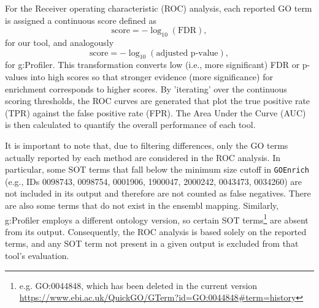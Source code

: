 \documentclass{article}
\begin{document}
    For the Receiver operating characteristic (ROC) analysis, each reported GO term is assigned a continuous score defined as
    \[
        \text{score} = -\log_{10}(\text{FDR}),
    \]
    for our tool, and analogously
    \[
        \text{score} = -\log_{10}(\text{adjusted p-value}),
    \]
    for g:Profiler. This transformation converts low (i.e., more significant) FDR or p-values into high scores so that stronger evidence (more significance) for enrichment corresponds to higher scores. By 'iterating' over the continuous scoring thresholds, the ROC curves are generated that plot the true positive rate (TPR) against the false positive rate (FPR). The Area Under the Curve (AUC) is then calculated to quantify the overall performance of each tool.

    It is important to note that, due to filtering differences, only the GO terms actually reported by each method are considered in the ROC analysis. In particular, some SOT terms that fall below the minimum size cutoff in \texttt{GOEnrich} (e.g., IDs 0098743, 0098754, 0001906, 1900047, 2000242, 0043473, 0034260) are not included in its output and therefore are not counted as false negatives. There are also some terms that do not exist in the ensembl mapping. Similarly, g:Profiler employs a different ontology version, so certain SOT terms\footnote{e.g. GO:0044848, which has been deleted in the current version \url{https://www.ebi.ac.uk/QuickGO/GTerm?id=GO:0044848\#term=history}} are absent from its output. Consequently, the ROC analysis is based solely on the reported terms, and any SOT term not present in a given output is excluded from that tool's evaluation.
\end{document}
